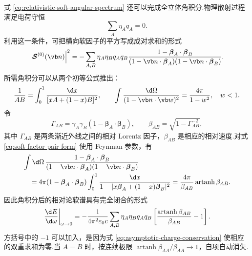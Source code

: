 式 \eqref{eq:relativistic-soft-angular-spectrum} 还可以完成全立体角积分.物理散射过程满足电荷守恒
\begin{equation}
 \sum_A\eta_Aq_A=0.
 \label{eq:asymptotic-charge-conservation}
\end{equation}
利用这一条件，可把横向软因子的平方写成成对求和的形式
\begin{equation}
 \left|\boldsymbol{\mathcal S}^{(0)}(\vb n)\right|^2
 =-
 \sum_{A,B}\eta_A\eta_Bq_Aq_B
 \frac{1-\boldsymbol\beta_A\cdot\boldsymbol\beta_B}
 {(1-\vb n\cdot\boldsymbol\beta_A)(1-\vb n\cdot\boldsymbol\beta_B)}.
 \label{eq:soft-factor-pair-form}
\end{equation}
所需角积分可以从两个初等公式推出：
\begin{equation}
 \frac{1}{AB}=\int_0^1\frac{\d x}{[xA+(1-x)B]^2},
 \qquad
 \int\frac{\d\Omega}{(1-\vb n\cdot\vb w)^2}
 =\frac{4\pi}{1-w^2},
 \quad w<1.
 \label{eq:soft-angular-integral-tools}
\end{equation}
令
\begin{equation}
 \Gamma_{AB}
 =\gamma_A\gamma_B
 \left(1-\boldsymbol\beta_A\cdot\boldsymbol\beta_B\right),
 \qquad
 \beta_{AB}=\sqrt{1-\Gamma_{AB}^{-2}},
 \label{eq:relative-gamma-soft}
\end{equation}
其中 $\Gamma_{AB}$ 是两条渐近外线之间的相对 Lorentz 因子，$\beta_{AB}$ 是相应的相对速度.对式 \eqref{eq:soft-factor-pair-form} 使用 Feynman 参数，有
\begin{align}
 &\int\d\Omega\,
 \frac{1-\boldsymbol\beta_A\cdot\boldsymbol\beta_B}
 {(1-\vb n\cdot\boldsymbol\beta_A)(1-\vb n\cdot\boldsymbol\beta_B)}
 \notag\\
 &\quad=4\pi
 (1-\boldsymbol\beta_A\cdot\boldsymbol\beta_B)
 \int_0^1\frac{\d x}
 {1-|x\boldsymbol\beta_A+(1-x)\boldsymbol\beta_B|^2}
 =\frac{4\pi}{\beta_{AB}}\operatorname{artanh}\beta_{AB}.
 \label{eq:soft-pair-angular-integral}
\end{align}
因此角积分后的相对论软谱具有完全闭合的形式
\begin{equation}
 \left.\frac{\d E}{\d\omega}\right|_{\omega\to0}
 =-\frac{1}{4\pi^2\varepsilon_0c}
 \sum_{A,B}\eta_A\eta_Bq_Aq_B
 \left[
 \frac{\operatorname{artanh}\beta_{AB}}{\beta_{AB}}-1
 \right].
 \label{eq:general-relativistic-soft-integrated-spectrum}
\end{equation}
方括号中的 $-1$ 可以加入，是因为式 \eqref{eq:asymptotic-charge-conservation} 使相应的双重求和为零.当 $A=B$ 时，按连续极限 $\operatorname{artanh}\beta_{AA}/\beta_{AA}\to1$，自项自动消失.

